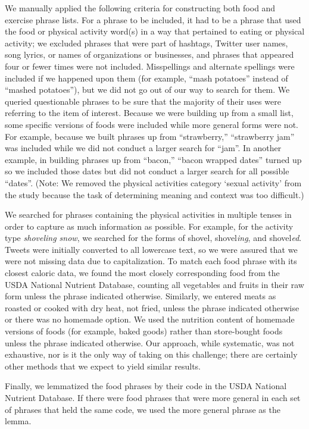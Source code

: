 We manually applied the following criteria for constructing both food and exercise
phrase lists.
For a phrase to be included, it had to be a phrase that used the food
or physical activity word(s) in a way that pertained to eating or
physical activity; we excluded phrases that were part of hashtags,
Twitter user names, song lyrics, or names of organizations or
businesses, and phrases that appeared four or fewer times were not
included.
Misspellings and alternate spellings were included if we happened upon
them (for example, ``mash potatoes'' instead of ``mashed potatoes''),
but we did not go out of our way to search for them.
We queried questionable phrases to be sure that the majority of their
uses were referring to the item of interest.
Because we were building up from a small list, some specific versions
of foods were included while more general forms were not.  For
example, because we built phrases up from ``strawberry,'' ``strawberry
jam'' was included while we did not conduct a larger search for ``jam''.
In another example, in building phrases up from ``bacon,'' ``bacon
wrapped dates'' turned up so we included those dates but did not
conduct a larger search for all possible ``dates''.
(Note: We removed the physical activities category `sexual activity'
from the study because the task of determining meaning and context was
too difficult.)

We searched for phrases containing the physical activities in multiple
tenses in order to capture as much information as possible.
For example, for the activity type \textit{shoveling snow}, we
searched for the forms of shovel, shovel\textit{ing}, and
shovel\textit{ed}.
Tweets were initially converted to all lowercase text, so we were
assured that we were not missing data due to capitalization.
To match each food phrase with its closest caloric data, we found the
most closely corresponding food from the USDA National Nutrient
Database, counting all vegetables and fruits in their raw form unless
the phrase indicated otherwise.
Similarly, we entered meats as roasted or cooked with dry heat, not fried, unless the phrase
indicated otherwise or there was no homemade option.
We used the nutrition content of homemade versions of foods (for
example, baked goods) rather than store-bought foods unless the phrase
indicated otherwise.
Our approach, while systematic, was not exhaustive, nor is it the only
way of taking on this challenge; there are certainly other methods
that we expect to yield similar results.

Finally, we lemmatized the food phrases by their code in the USDA
National Nutrient Database.  If there were food phrases that were more
general in each set of phrases that held the same code, we used the
more general phrase as the lemma.


